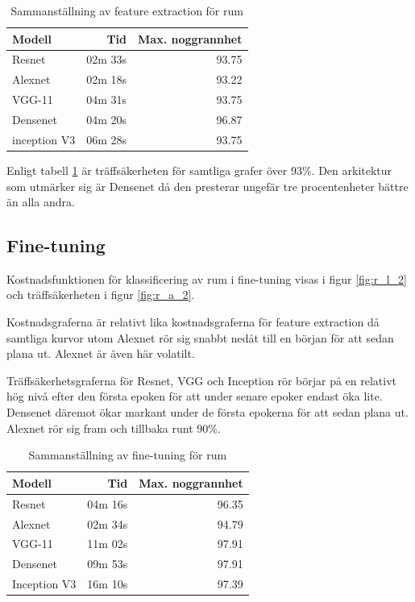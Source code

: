 \documentclass[]{kththesis}
\begin{document}
\begin{table}[!htbp]
  \centering
  \begin{tabular}{|l|r|r|}
    Modell & Tid & Max. noggrannhet \\ 
    \hline
    Resnet       & 02m 33s & 93.75 \\
    Alexnet      & 02m 18s & 93.22 \\
    VGG-11       & 04m 31s & 93.75 \\
    Densenet     & 04m 20s & 96.87 \\
    inception V3 & 06m 28s & 93.75 \\
  \end{tabular}
  \caption{Sammanställning av feature extraction för rum}
  \label{fig:sam_5}
\end{table}

Enligt tabell \ref{fig:sam_5} är träffsäkerheten för samtliga grafer över 93\%.
Den arkitektur som utmärker sig är Densenet då den presterar ungefär tre procentenheter bättre än alla andra.

\subsection{Fine-tuning}
Kostnadsfunktionen för klassificering av rum i fine-tuning visas i figur \ref{fig:r_l_2} och träffsäkerheten i figur \ref{fig:r_a_2}.

Kostnadsgraferna är relativt lika kostnadsgraferna för feature extraction då samtliga kurvor utom Alexnet rör sig snabbt nedåt till en början för att sedan plana ut. Alexnet är även här volatilt.

Träffsäkerhetsgraferna för Resnet, VGG och Inception rör börjar på en relativt hög nivå efter den första epoken för att under senare epoker endast öka lite.
Densenet däremot ökar markant under de första epokerna för att sedan plana ut. 
Alexnet rör sig fram och tillbaka runt 90\%. 

\begin{table}[!htbp]
  \centering
  \begin{tabular}{|l|r|r|}
    Modell & Tid & Max. noggrannhet \\ 
    \hline
    Resnet       & 04m 16s & 96.35 \\
    Alexnet      & 02m 34s & 94.79 \\
    VGG-11       & 11m 02s & 97.91 \\
    Densenet     & 09m 53s & 97.91 \\
    Inception V3 & 16m 10s & 97.39 \\
  \end{tabular}
  \caption{Sammanställning av fine-tuning för rum}
  \label{fig:sam_6}    
\end{table}
\end{document}
